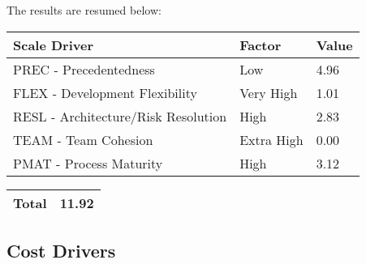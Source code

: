 \documentclass[\mainpath/main]{subfiles}
\begin{document}
The results are resumed below:
\begin{table}[h]
	\begin{tabular}{|L{7.5cm}|C{2.5cm}|C{2cm}|}
		\hline \textbf{Scale Driver} & \textbf{Factor} & \textbf{Value} \\
		\hline PREC - Precedentedness & Low & 4.96 \\
		\hline FLEX - Development Flexibility & Very High & 1.01 \\
		\hline RESL - Architecture/Risk Resolution & High & 2.83 \\
		\hline TEAM - Team Cohesion & Extra High & 0.00 \\
		\hline PMAT - Process Maturity & High & 3.12 \\
		\hline 
	\end{tabular} 
	\begin{tabular}{|L{10.43cm}|C{2cm}|}
		\hline \textbf{Total} & 11.92 \\
		\hline
	\end{tabular}
\end{table}


\subsection{Cost Drivers}
\end{document}
